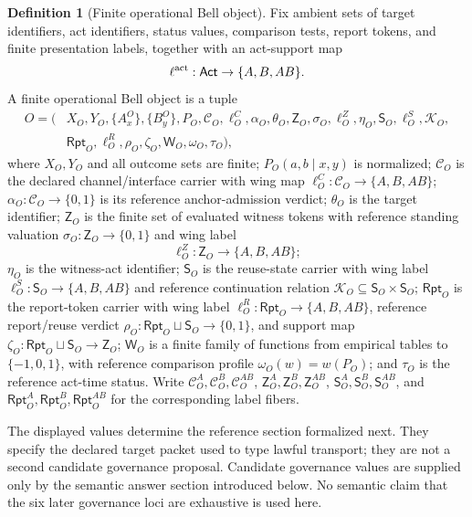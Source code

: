 \documentclass[11pt]{article}
\theoremstyle{definition}
\newtheorem{definition}[theorem]{Definition}
\begin{document}
\begin{definition}[Finite operational Bell object]\label{def:operationalbellobject}
Fix ambient sets of target identifiers, act identifiers, status values, comparison tests, report tokens, and finite presentation labels, together with an act-support map
\[
\ell^{\rm act}:\mathsf{Act}\to\{A,B,AB\}.
\]
A finite operational Bell object is a tuple
\[
\begin{aligned}
O=(&X_O,Y_O,\{A^O_x\},\{B^O_y\},P_O,\mathcal C_O,\ell_O^{C},\alpha_O,\theta_O,
\mathsf Z_O,\sigma_O,\ell_O^{Z},\eta_O,\mathsf S_O,\ell_O^{S},\mathcal K_O,\\
&\mathsf{Rpt}_O,\ell_O^{R},\rho_O,\zeta_O,\mathsf W_O,\omega_O,\tau_O),
\end{aligned}
\]
where $X_O,Y_O$ and all outcome sets are finite; $P_O(a,b\mid x,y)$ is normalized; $\mathcal C_O$ is the declared channel/interface carrier with wing map $\ell_O^{C}:\mathcal C_O\to\{A,B,AB\}$; $\alpha_O:\mathcal C_O\to\{0,1\}$ is its reference anchor-admission verdict; $\theta_O$ is the target identifier; $\mathsf Z_O$ is the finite set of evaluated witness tokens with reference standing valuation $\sigma_O:\mathsf Z_O\to\{0,1\}$ and wing label
\[
\ell_O^{Z}:\mathsf Z_O\to\{A,B,AB\};
\]
$\eta_O$ is the witness-act identifier; $\mathsf S_O$ is the reuse-state carrier with wing label $\ell_O^{S}:\mathsf S_O\to\{A,B,AB\}$ and reference continuation relation $\mathcal K_O\subseteq\mathsf S_O\times\mathsf S_O$; $\mathsf{Rpt}_O$ is the report-token carrier with wing label $\ell_O^{R}:\mathsf{Rpt}_O\to\{A,B,AB\}$, reference report/reuse verdict $\rho_O:\mathsf{Rpt}_O\sqcup\mathsf S_O\to\{0,1\}$, and support map $\zeta_O:\mathsf{Rpt}_O\sqcup\mathsf S_O\to\mathsf Z_O$; $\mathsf W_O$ is a finite family of functions from empirical tables to $\{-1,0,1\}$, with reference comparison profile $\omega_O(w)=w(P_O)$; and $\tau_O$ is the reference act-time status. Write $\mathcal C_O^A,\mathcal C_O^B,\mathcal C_O^{AB}$, $\mathsf Z_O^A,\mathsf Z_O^B,\mathsf Z_O^{AB}$, $\mathsf S_O^A,\mathsf S_O^B,\mathsf S_O^{AB}$, and $\mathsf{Rpt}_O^A,\mathsf{Rpt}_O^B,\mathsf{Rpt}_O^{AB}$ for the corresponding label fibers.

The displayed values determine the reference section formalized next. They specify the declared target packet used to type lawful transport; they are not a second candidate governance proposal. Candidate governance values are supplied only by the semantic answer section introduced below. No semantic claim that the six later governance loci are exhaustive is used here.
\end{definition}
\end{document}
